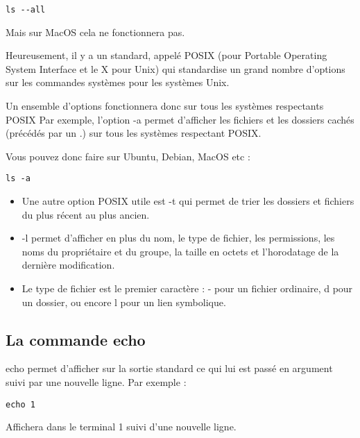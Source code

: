 \documentclass{article}
\begin{document}
\begin{verbatim}
ls --all
\end{verbatim}

Mais sur {\color{blue}MacOS} cela ne fonctionnera pas.

Heureusement, il y a un standard, appelé {\color{blue}POSIX} (pour {\color{blue}Portable Operating System Interface} et le {\color{blue}X} pour {\color{blue}Unix}) qui standardise un grand nombre d'options sur les commandes systèmes pour les systèmes {\color{blue}Unix}.

Un ensemble d'options fonctionnera donc sur tous les systèmes respectants {\color{blue}POSIX} Par exemple, l'option {\color{blue}-a} permet d'afficher les fichiers et les dossiers cachés (précédés par un .) sur tous les systèmes respectant {\color{blue}POSIX}.

Vous pouvez donc faire sur {\color{blue}Ubuntu}, {\color{blue}Debian}, {\color{blue}MacOS} etc :


\begin{verbatim}
ls -a
\end{verbatim}
\begin{itemize}
\item Une autre option {\color{blue}POSIX} utile est {\color{blue}-t} qui permet de trier les dossiers et fichiers du plus récent au plus ancien.
\item {\color{blue}-l} permet d'afficher en plus du nom, le type de fichier, les permissions, les noms du propriétaire et du groupe, la taille en octets et l'horodatage de la dernière modification.
\item Le type de fichier est le premier caractère : {\color{blue}-} pour un fichier ordinaire, {\color{blue}d} pour un dossier, ou encore {\color{blue}l} pour un lien symbolique.
\end{itemize}

\subsection{La commande {\color{blue}echo}}
{\color{blue}echo} permet d'afficher sur la sortie standard ce qui lui est passé en argument suivi par une nouvelle ligne. Par exemple :

\begin{verbatim}
echo 1
\end{verbatim}
Affichera dans le terminal 1 suivi d'une nouvelle ligne.
\end{document}
